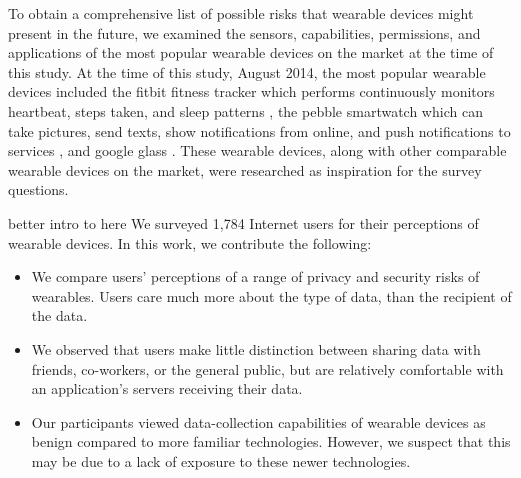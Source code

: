 To obtain a comprehensive list of possible risks that wearable devices might present in the future, we examined the sensors, capabilities, permissions, and applications of the most popular wearable devices on the market at the time of this study. At the time of this study, August 2014, the most popular wearable devices included the fitbit fitness tracker which performs continuously monitors heartbeat, steps taken, and sleep patterns \cite{6_fitbit_2014, 7_time_2014}, the pebble smartwatch which can take pictures, send texts, show notifications from online, and push notifications to services \cite{pebble_smartwatch_2014, 9_verge_2014, 10_readwrite_2014}, and google glass \cite{11_wikipedia_2015, 12_turi_2014}. These wearable devices, along with other comparable wearable devices on the market, were researched as inspiration for the survey questions. 

{\color {red} better intro to here} We surveyed 1,784 Internet users for their perceptions of wearable devices. In this work, we contribute the following: \\[-0.8cm]

\begin{itemize} \itemsep1pt \parskip0pt 
\item We compare users' perceptions of a range of privacy and security risks of wearables. Users care much more about the type of data, than the recipient of the data.
\item We observed that users make little distinction between sharing data with friends, co-workers, or the general public, but are relatively comfortable with an application's servers receiving their data.
\item Our participants viewed data-collection capabilities of wearable devices as benign compared to more familiar technologies. However, we suspect that this may be due to a lack of exposure to these newer technologies.
\end{itemize}